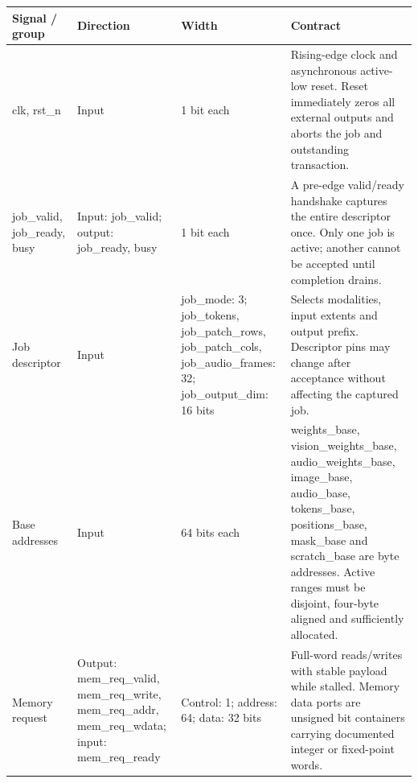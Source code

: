 \documentclass[11pt,a4paper]{article}
\begin{document}
{\small\renewcommand{\arraystretch}{1.18}\begin{longtable}{@{}L{0.21\textwidth}|L{0.12\textwidth}|L{0.12\textwidth}|L{0.45\textwidth}@{}}\toprule

\textbf{Signal /\allowbreak{} group} & \textbf{Direction} & \textbf{Width} & \textbf{Contract}\\\midrule\endhead

clk,\allowbreak{} rst\_\allowbreak{}n & Input & 1 bit each & Rising-edge clock and asynchronous active-low reset. Reset immediately zeros all external outputs and aborts the job and outstanding transaction.\\[2pt]\hline

job\_\allowbreak{}valid,\allowbreak{} job\_\allowbreak{}ready,\allowbreak{} busy & Input: job\_\allowbreak{}valid; output: job\_\allowbreak{}ready,\allowbreak{} busy & 1 bit each & A pre-edge valid/\allowbreak{}ready handshake captures the entire descriptor once. Only one job is active; another cannot be accepted until completion drains.\\[2pt]\hline

Job descriptor & Input & job\_\allowbreak{}mode: 3; job\_\allowbreak{}tokens,\allowbreak{} job\_\allowbreak{}patch\_\allowbreak{}rows,\allowbreak{} job\_\allowbreak{}patch\_\allowbreak{}cols,\allowbreak{} job\_\allowbreak{}audio\_\allowbreak{}frames: 32; job\_\allowbreak{}output\_\allowbreak{}dim: 16 bits & Selects modalities,\allowbreak{} input extents and output prefix. Descriptor pins may change after acceptance without affecting the captured job.\\[2pt]\hline

Base addresses & Input & 64 bits each & weights\_\allowbreak{}base,\allowbreak{} vision\_\allowbreak{}weights\_\allowbreak{}base,\allowbreak{} audio\_\allowbreak{}weights\_\allowbreak{}base,\allowbreak{} image\_\allowbreak{}base,\allowbreak{} audio\_\allowbreak{}base,\allowbreak{} tokens\_\allowbreak{}base,\allowbreak{} positions\_\allowbreak{}base,\allowbreak{} mask\_\allowbreak{}base and scratch\_\allowbreak{}base are byte addresses. Active ranges must be disjoint,\allowbreak{} four-byte aligned and sufficiently allocated.\\[2pt]\hline

Memory request & Output: mem\_\allowbreak{}req\_\allowbreak{}valid,\allowbreak{} mem\_\allowbreak{}req\_\allowbreak{}write,\allowbreak{} mem\_\allowbreak{}req\_\allowbreak{}addr,\allowbreak{} mem\_\allowbreak{}req\_\allowbreak{}wdata; input: mem\_\allowbreak{}req\_\allowbreak{}ready & Control: 1; address: 64; data: 32 bits & Full-word reads/\allowbreak{}writes with stable payload while stalled. Memory data ports are unsigned bit containers carrying documented integer or fixed-point words.\\[2pt]\hline


\end{longtable}}
\end{document}
